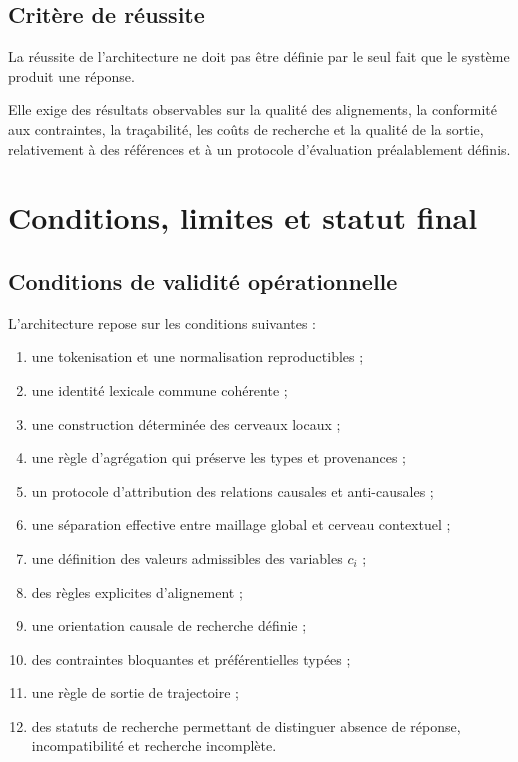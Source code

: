 \documentclass[11pt,a4paper,oneside]{book}
\theoremstyle{remark}
\begin{document}
\section{Critère de réussite}

La réussite de l'architecture ne doit pas être définie par le seul
fait que le système produit une réponse.

Elle exige des résultats observables sur la qualité des alignements,
la conformité aux contraintes, la traçabilité, les coûts de recherche
et la qualité de la sortie, relativement à des références et à un
protocole d'évaluation préalablement définis.


\chapter{Conditions, limites et statut final}

\section{Conditions de validité opérationnelle}

L'architecture repose sur les conditions suivantes :

\begin{enumerate}
  \item une tokenisation et une normalisation reproductibles ;
  \item une identité lexicale commune cohérente ;
  \item une construction déterminée des cerveaux locaux ;
  \item une règle d'agrégation qui préserve les types et provenances ;
  \item un protocole d'attribution des relations causales et
        anti-causales ;
  \item une séparation effective entre maillage global et cerveau
        contextuel ;
  \item une définition des valeurs admissibles des variables \(c_i\) ;
  \item des règles explicites d'alignement ;
  \item une orientation causale de recherche définie ;
  \item des contraintes bloquantes et préférentielles typées ;
  \item une règle de sortie de trajectoire ;
  \item des statuts de recherche permettant de distinguer absence
        de réponse, incompatibilité et recherche incomplète.
\end{enumerate}
\end{document}
